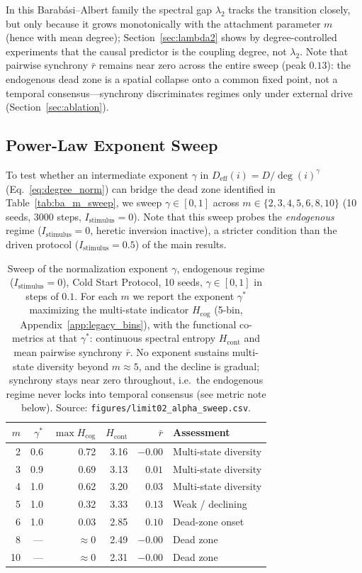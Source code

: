 ﻿\documentclass[11pt]{article}
\begin{document}
In this Barab\'asi--Albert family the spectral gap $\lambda_2$ tracks the transition closely, but only because it grows monotonically with the attachment parameter $m$ (hence with mean degree); Section~\ref{sec:lambda2} shows by degree-controlled experiments that the causal predictor is the coupling degree, not $\lambda_2$. Note that pairwise synchrony $\bar{r}$ remains near zero across the entire sweep (peak $0.13$): the endogenous dead zone is a spatial collapse onto a common fixed point, not a temporal consensus---synchrony discriminates regimes only under external drive (Section~\ref{sec:ablation}).

\subsection{Power-Law Exponent Sweep}
\label{sec:alpha_sweep}

To test whether an intermediate exponent $\gamma$ in $D_{\text{eff}}(i) = D/\deg(i)^\gamma$ (Eq.~\ref{eq:degree_norm}) can bridge the dead zone identified in Table~\ref{tab:ba_m_sweep}, we sweep $\gamma \in [0, 1]$ across $m \in \{2, 3, 4, 5, 6, 8, 10\}$ (10 seeds, 3000 steps, $I_{\text{stimulus}} = 0$). Note that this sweep probes the \emph{endogenous} regime ($I_{\text{stimulus}} = 0$, heretic inversion inactive), a stricter condition than the driven protocol ($I_{\text{stimulus}} = 0.5$) of the main results.

\begin{table}[ht]
\centering
\caption{Sweep of the normalization exponent $\gamma$, endogenous regime ($I_{\text{stimulus}}=0$), Cold Start Protocol, 10 seeds, $\gamma \in [0,1]$ in steps of $0.1$. For each $m$ we report the exponent $\gamma^*$ maximizing the multi-state indicator $H_{\text{cog}}$ (5-bin, Appendix~\ref{app:legacy_bins}), with the functional co-metrics at that $\gamma^*$: continuous spectral entropy $H_{\text{cont}}$ and mean pairwise synchrony $\bar{r}$. No exponent sustains multi-state diversity beyond $m \approx 5$, and the decline is gradual; synchrony stays near zero throughout, i.e.\ the endogenous regime never locks into temporal consensus (see metric note below). Source: \texttt{figures/limit02\_alpha\_sweep.csv}.}
\label{tab:alpha_sweep}
\begin{tabular}{rrrrrl}
\toprule
$m$ & $\gamma^*$ & $\max H_{\text{cog}}$ & $H_{\text{cont}}$ & $\bar{r}$ & Assessment \\
\midrule
2  & 0.6 & 0.72 & 3.16 & $-0.00$ & Multi-state diversity \\
3  & 0.9 & 0.69 & 3.13 & $0.01$  & Multi-state diversity \\
4  & 1.0 & 0.62 & 3.20 & $0.03$  & Multi-state diversity \\
5  & 1.0 & 0.32 & 3.33 & $0.13$  & Weak / declining \\
6  & 1.0 & 0.03 & 2.85 & $0.10$  & Dead-zone onset \\
8  & --- & $\approx 0$ & 2.49 & $-0.00$ & Dead zone \\
10 & --- & $\approx 0$ & 2.31 & $-0.00$ & Dead zone \\
\bottomrule
\end{tabular}
\end{table}
\end{document}
